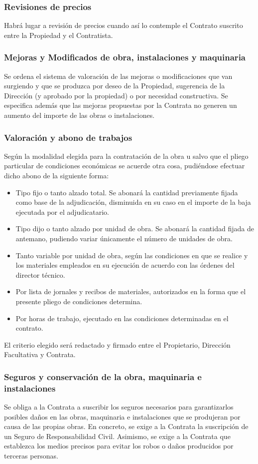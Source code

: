 \documentclass[../main.tex]{subfiles}
\begin{document}
\subsubsection{Revisiones de precios}
Habrá lugar a revisión de precios cuando así lo contemple el Contrato suscrito entre la Propiedad y el Contratista.

\subsubsection{Mejoras y Modificados de obra, instalaciones y maquinaria}
Se ordena el sistema de valoración de las mejoras o modificaciones que van surgiendo y que se produzca por deseo de la Propiedad, sugerencia de la Dirección (y aprobado por la propiedad) o por necesidad constructiva. Se especifica además que las mejoras propuestas por la Contrata no generen un aumento del importe de las obras o instalaciones.

\subsubsection{Valoración y abono de trabajos}
Según la modalidad elegida para la contratación de la obra u salvo que el pliego particular de condiciones económicas se acuerde otra cosa, pudiéndose efectuar dicho abono de la siguiente forma:
\begin{itemize}
    \item Tipo fijo o tanto alzado total. Se abonará la cantidad previamente fijada como base de la adjudicación, disminuida en su caso en el importe de la baja ejecutada por el adjudicatario.
    \item Tipo dijo o tanto alzado por unidad de obra. Se abonará la cantidad fijada de antemano, pudiendo variar únicamente el número de unidades de obra.
    \item Tanto variable por unidad de obra, según las condiciones en que se realice y los materiales empleados en su ejecución de acuerdo con las órdenes del director técnico.
    \item Por lista de jornales y recibos de materiales, autorizados en la forma que el presente pliego de condiciones determina.
    \item Por horas de trabajo, ejecutado en las condiciones determinadas en el contrato.
\end{itemize}
El criterio elegido será redactado y firmado entre el Propietario, Dirección Facultativa y Contrata.

\subsubsection{Seguros y conservación de la obra, maquinaria e instalaciones}
Se obliga a la Contrata a suscribir los seguros necesarios para garantizarlos posibles daños en las obras, maquinaria e instalaciones que se produjeran por causa de las propias obras. En concreto, se exige a la Contrata la suscripción de un Seguro de Responsabilidad Civil. Asimismo, se exige a la Contrata que establezca los medios precisos para evitar los robos o daños producidos por terceras personas.  
\end{document}
